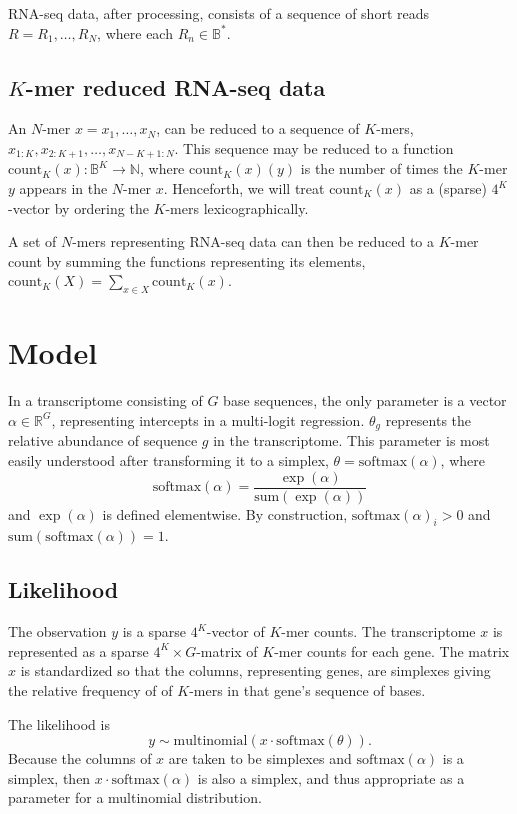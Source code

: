 \documentclass{article}
\begin{document}
RNA-seq data, after processing, consists of a sequence of short reads
$R = R_1, \ldots, R_N$, where each $R_n \in \mathbb{B}^*$.

\subsection{$K$-mer reduced RNA-seq data}

An $N$-mer $x = x_1, \ldots, x_N$, can be reduced to a sequence of
$K$-mers, $x_{1:K}, x_{2:K+1}, \ldots, x_{N-K+1:N}$.  This sequence
may be reduced to a function
$\textrm{count}_K(x):\mathbb{B}^K \rightarrow \mathbb{N}$, where
$\textrm{count}_K(x)(y)$ is the number of times the $K$-mer $y$
appears in the $N$-mer $x$.  Henceforth, we will treat
$\textrm{count}_K(x)$ as a (sparse) $4^K$-vector by ordering the
$K$-mers lexicographically.

A set of $N$-mers representing RNA-seq data can then be reduced to a
$K$-mer count by summing the functions representing its elements,
$\textrm{count}_K(X) = \sum_{x \in X} \textrm{count}_K(x)$.

\section{Model}

In a transcriptome consisting of $G$ base sequences, the only
parameter is a vector $\alpha \in \mathbb{R}^G$, representing
intercepts in a multi-logit regression.  $\theta_g$ represents the
relative abundance of sequence $g$ in the transcriptome. This
parameter is most easily understood after transforming it to a
simplex, $\theta = \textrm{softmax}(\alpha)$, where
\[
  \textrm{softmax}(\alpha)
  = \frac{\exp(\alpha)}
         {\textrm{sum}(\exp(\alpha))}
\]
and $\exp(\alpha)$ is defined elementwise.  By construction,
$\textrm{softmax}(\alpha)_i > 0$ and
$\textrm{sum}(\textrm{softmax}(\alpha)) = 1$.

\subsection{Likelihood}

The observation $y$ is a sparse $4^K$-vector of $K$-mer counts.  The
transcriptome $x$ is represented as a sparse $4^K \times G$-matrix of
$K$-mer counts for each gene.  The matrix $x$ is standardized so that
the columns, representing genes, are simplexes giving the relative
frequency of of $K$-mers in that gene's sequence of bases.

The likelihood is
\[
  y \sim \textrm{multinomial}(x \cdot \textrm{softmax}(\theta)).
\]
Because the columns of $x$ are taken to be simplexes and
$\textrm{softmax}(\alpha)$ is a simplex, then
$x \cdot \textrm{softmax}(\alpha)$ is also a simplex, and thus
appropriate as a parameter for a multinomial distribution.
\end{document}
